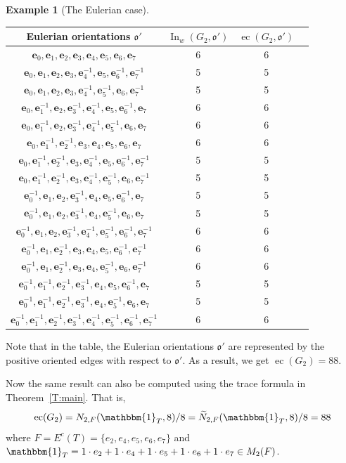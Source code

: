\documentclass[11pt]{amsart}
\theoremstyle{plain}
\theoremstyle{definition}
\newtheorem{example}[theorem]{Example}
\newcommand{\mfrako}{{\mathfrak o}}
\newcommand{\ve}{{\mathbf e}}
\DeclareMathOperator{\ec}{\operatorname{ec}}
\DeclareMathOperator{\In}{\operatorname{In}}
\numberwithin{equation}{section}
\begin{document}
\begin{example}[The Eulerian case]
\begin{center}
\begin{tabular}{|c|c|c|c|}
\hline
Eulerian orientations $\mfrako'$ & $\In_w(G_2,\mfrako')$ & $\ec(G_2,\mfrako')$\\ \hline 
$\ve_0,\ve_1,\ve_2,\ve_3,\ve_4,\ve_5,\ve_6,\ve_7$ & 6 & 6  \\ \hline
$\ve_0,\ve_1,\ve_2,\ve_3,\ve_4^{-1},\ve_5,\ve_6^{-1},\ve_7^{-1}$ & 5 & 5  \\ \hline
$\ve_0,\ve_1,\ve_2,\ve_3,\ve_4^{-1},\ve_5^{-1},\ve_6,\ve_7^{-1}$ & 5 & 5  \\ \hline
$\ve_0,\ve_1^{-1},\ve_2,\ve_3^{-1},\ve_4^{-1},\ve_5,\ve_6^{-1},\ve_7$ & 6 & 6  \\ \hline
$\ve_0,\ve_1^{-1},\ve_2,\ve_3^{-1},\ve_4^{-1},\ve_5^{-1},\ve_6,\ve_7$ & 6 & 6  \\ \hline
$\ve_0,\ve_1^{-1},\ve_2^{-1},\ve_3,\ve_4,\ve_5,\ve_6,\ve_7$ & 6 & 6  \\ \hline
$\ve_0,\ve_1^{-1},\ve_2^{-1},\ve_3,\ve_4^{-1},\ve_5,\ve_6^{-1},\ve_7^{-1}$ & 5 & 5  \\ \hline
$\ve_0,\ve_1^{-1},\ve_2^{-1},\ve_3,\ve_4^{-1},\ve_5^{-1},\ve_6,\ve_7^{-1}$ & 5 & 5  \\ \hline
$\ve_0^{-1},\ve_1,\ve_2,\ve_3^{-1},\ve_4,\ve_5,\ve_6^{-1},\ve_7$ & 5 & 5  \\ \hline
$\ve_0^{-1},\ve_1,\ve_2,\ve_3^{-1},\ve_4,\ve_5^{-1},\ve_6,\ve_7$ & 5 & 5  \\ \hline
$\ve_0^{-1},\ve_1,\ve_2,\ve_3^{-1},\ve_4^{-1},\ve_5^{-1},\ve_6^{-1},\ve_7^{-1}$ & 6 & 6  \\ \hline
$\ve_0^{-1},\ve_1,\ve_2^{-1},\ve_3,\ve_4,\ve_5,\ve_6^{-1},\ve_7^{-1}$ & 6 & 6  \\ \hline
$\ve_0^{-1},\ve_1,\ve_2^{-1},\ve_3,\ve_4,\ve_5^{-1},\ve_6,\ve_7^{-1}$ & 6 & 6  \\ \hline
$\ve_0^{-1},\ve_1^{-1},\ve_2^{-1},\ve_3^{-1},\ve_4,\ve_5,\ve_6^{-1},\ve_7$ & 5 & 5  \\ \hline
$\ve_0^{-1},\ve_1^{-1},\ve_2^{-1},\ve_3^{-1},\ve_4,\ve_5^{-1},\ve_6,\ve_7$ & 5 & 5  \\ \hline
$\ve_0^{-1},\ve_1^{-1},\ve_2^{-1},\ve_3^{-1},\ve_4^{-1},\ve_5^{-1},\ve_6^{-1},\ve_7^{-1}$ & 6 & 6  \\ \hline
\end{tabular}
\end{center}

Note that in the table, the Eulerian orientations $\mfrako'$ are represented by the positive oriented edges with respect to $\mfrako'$. As a result, we get $\ec(G_2)=88$. 

Now the same result can also be computed using the trace formula in Theorem~\ref{T:main}. That is, 
$$\ec(G_2)= N_{2,F}(\mathbbm{1}_T,8)/8=\widetilde{N}_{2,F}(\mathbbm{1}_T,8)/8=88$$ where $F=E^c(T)=\{e_2,e_4,e_5,e_6,e_7\}$ and $\mathbbm{1}_T= 1\cdot e_2+1\cdot e_4+1\cdot e_5+1\cdot e_6+1\cdot e_7 \in M_2(F)$. %

\end{example}
\end{document}
